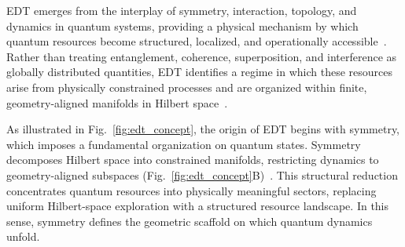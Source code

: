 \documentclass[twocolumn,10pt]{article}
\begin{document}
%


EDT emerges from the interplay of symmetry, interaction, topology, and dynamics in quantum systems, providing a physical mechanism by which quantum resources become structured, localized, and operationally accessible~\cite{NielsenChuang,Horodecki2009}. Rather than treating entanglement, coherence, superposition, and interference as globally distributed quantities, EDT identifies a regime in which these resources arise from physically constrained processes and are organized within finite, geometry-aligned manifolds in Hilbert space~\cite{Amico2008,Eisert2010}.

As illustrated in Fig.~\ref{fig:edt_concept}, the origin of EDT begins with symmetry, which imposes a fundamental organization on quantum states. Symmetry decomposes Hilbert space into constrained manifolds, restricting dynamics to geometry-aligned subspaces (Fig.~\ref{fig:edt_concept}B)~\cite{Wigner1959,Georgi1999}. This structural reduction concentrates quantum resources into physically meaningful sectors, replacing uniform Hilbert-space exploration with a structured resource landscape. In this sense, symmetry defines the geometric scaffold on which quantum dynamics unfold.
\end{document}
